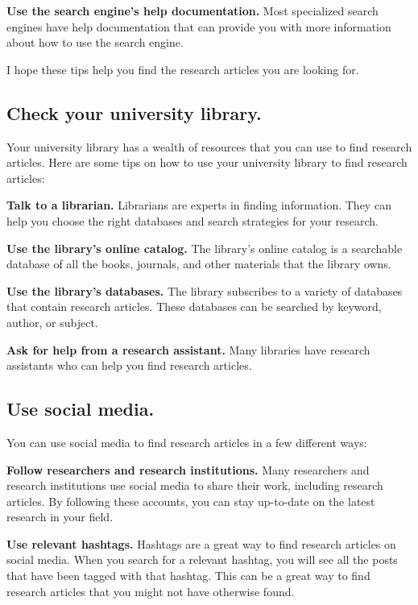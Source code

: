 \documentclass[
]{book}
\begin{document}
\textbf{Use the search engine's help documentation.} Most specialized search engines have help documentation that can provide you with more information about how to use the search engine.

I hope these tips help you find the research articles you are looking for.

\subsection*{Check your university library.}\label{check-your-university-library.}

Your university library has a wealth of resources that you can use to find research articles. Here are some tips on how to use your university library to find research articles:

\textbf{Talk to a librarian.} Librarians are experts in finding information. They can help you choose the right databases and search strategies for your research.

\textbf{Use the library's online catalog.} The library's online catalog is a searchable database of all the books, journals, and other materials that the library owns.

\textbf{Use the library's databases.} The library subscribes to a variety of databases that contain research articles. These databases can be searched by keyword, author, or subject.

\textbf{Ask for help from a research assistant.} Many libraries have research assistants who can help you find research articles.

\subsection*{Use social media.}\label{use-social-media.}

You can use social media to find research articles in a few different ways:

\textbf{Follow researchers and research institutions.} Many researchers and research institutions use social media to share their work, including research articles. By following these accounts, you can stay up-to-date on the latest research in your field.

\textbf{Use relevant hashtags.} Hashtags are a great way to find research articles on social media. When you search for a relevant hashtag, you will see all the posts that have been tagged with that hashtag. This can be a great way to find research articles that you might not have otherwise found.
\end{document}
